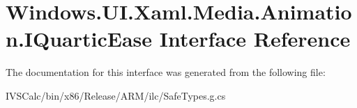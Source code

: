 \hypertarget{interface_windows_1_1_u_i_1_1_xaml_1_1_media_1_1_animation_1_1_i_quartic_ease}{}\section{Windows.\+U\+I.\+Xaml.\+Media.\+Animation.\+I\+Quartic\+Ease Interface Reference}
\label{interface_windows_1_1_u_i_1_1_xaml_1_1_media_1_1_animation_1_1_i_quartic_ease}


The documentation for this interface was generated from the following file\+:\begin{DoxyCompactItemize}
\item 
I\+V\+S\+Calc/bin/x86/\+Release/\+A\+R\+M/ilc/Safe\+Types.\+g.\+cs\end{DoxyCompactItemize}
